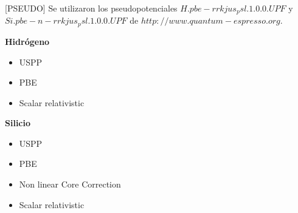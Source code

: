 
[PSEUDO] Se utilizaron los pseudopotenciales $H.pbe-rrkjus_psl.1.0.0.UPF$ y 
$Si.pbe-n-rrkjus_psl.1.0.0.UPF$ de $http://www.quantum-espresso.org.$

\vspace{0.5cm}

\textbf{Hidrógeno}

\begin{itemize}
    \item USPP
    \item PBE 
    \item Scalar relativistic
\end{itemize}

\vspace{0.5cm}

\textbf{Silicio}

\begin{itemize}
    \item USPP
    \item PBE 
    \item Non linear Core Correction
    \item Scalar relativistic
\end{itemize}

\newpage
